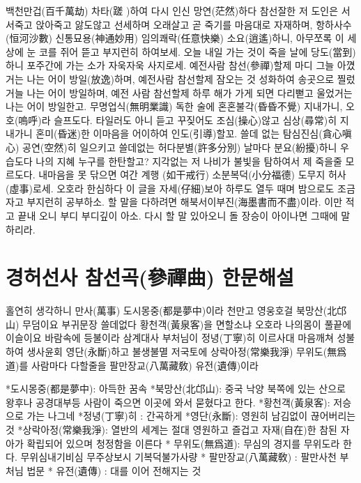 \documentclass[12pt, a4paper, oneside]{book}
\let\stdsection\section
\renewcommand\section{\newpage\stdsection}
\begin{document}
백천만겁(百千萬劫) 차타(蹉 )하여 다시 인신 망연(茫然)하다
참선잘한 저 도인은 서서죽고 앉아죽고 앓도않고 선세하며
오래살고 곧 죽기를 마음대로 자재하며, 항하사수(恒河沙數)
신통묘용(神通妙用) 임의쾌락(任意快樂) 소요(逍遙)하니,
아무쪼록 이 세상에 눈 코를 쥐어 뜯고 부지런히 하여보세.
오늘 내일 가는 것이 죽을 날에 당도(當到)하니 포주간에
가는 소가 자욱자욱 사지로세.
예전사람 참선(參禪)할제 마디 그늘 아꼈거는
나는 어이 방일(放逸)하며,
예전사람 참선할제 잠오는 것 성화하여 송곳으로 찔렀거늘
나는 어이 방일하며,
예전 사람 참선할제 하루 해가 가게 되면 다리뻗고 울었거는
나는 어이 방일한고.
무명업식(無明業識) 독한 술에 혼혼불각(昏昏不覺) 지내가니,
오호(嗚呼)라 슬프도다.
타일러도 아니 듣고 꾸짖어도 조심(操心)않고 심상(尋常)히
지내가니 혼미(昏迷)한 이마음을 어이하여 인도(引導)할꼬.
쓸데 없는 탐심진심(貪心嗔心) 공연(空然)히 일으키고 쓸데없는
허다분별(許多分別) 날마다 분요(紛擾)하니 우습도다 나의 지혜
누구를 한탄할고?
지각없는 저 나비가 불빛을 탐하여서 제 죽을줄 모르도다.
내마음을 못 닦으면 여간 계행 (如干戒行) 소분복덕(小分福德)
도무지 허사(虛事)로세.
오호라 한심하다
이 글을 자세(仔細)보아 하루도 열두 때며 밤으로도
조금 자고 부지런히 공부하소.
할 말을 다하려면 해북서이부진(海墨書而不盡)이라.
이만 적고 끝내 오니 부디 부디깊이 아소.
다시 할 말 있아오니 돌 장승이 아이나면 그때에 말하리라.



%										
	\section{ 경허선사 참선곡(參禪曲)  한문해설 }



홀연히 생각하니 만사(萬事) 도시몽중(都是夢中)이라 천만고 영웅호걸 북망산(北邙山) 무덤이요 부귀문장 쓸데없다 황천객(黃泉客)을 면할소냐 오호라 나의몸이 풀끝에 이슬이요 바람속에 등불이라 삼계대사 부처님이 정녕(丁寧)히 이르사대 마음깨쳐 성불하여 생사윤회 영단(永斷)하고 불생불멸 저국토에 상락아정(常樂我淨) 무위도(無爲道)를 사람마다 다할줄을 팔만장교(八萬藏敎) 유전(遺傳)이라

*도시몽중(都是夢中): 아득한 꿈속
*북망산(北邙山): 중국 낙양 북쪽에 있는 산으로 왕후나 공경대부등 사람이 죽으면 이곳에 와서 묻혔다고 한다.
*황천객(黃泉客): 저승으로 가는 나그네
*정녕(丁寧)히 : 간곡하게
*영단(永斷): 영원히 남김없이 끊어버리는 것
*상락아정(常樂我淨): 열반의 세계는 절대 영원하고 즐겁고 자재(自在)한  참된 자아가 확립되어 있으며 청정함을 이른다
* 무위도(無爲道): 무심의 경지를 무위도라 한다. 무위심내기비심 무주상보시 기복덕불가사량
* 팔만장교(八萬藏敎) : 팔만사천 부처님 법문
* 유전(遺傳) : 대를 이어 전해지는 것
\end{document}
